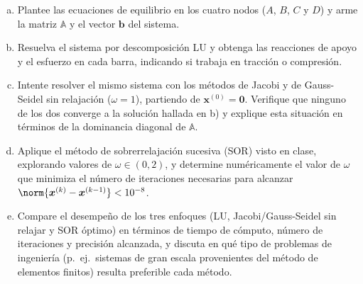 \documentclass[11pt]{article}
\begin{document}
\begin{question}
	\begin{enumerate}[a)]
		\item Plantee las ecuaciones de equilibrio en los cuatro nodos ($A$, $B$, $C$ y
		      $D$) y arme la matriz $\mathbb{A}$ y el vector $\bm{b}$ del sistema.
		\item Resuelva el sistema por descomposición LU y obtenga las reacciones de
		      apoyo y el esfuerzo en cada barra, indicando si trabaja en tracción o
		      compresión.
		\item Intente resolver el mismo sistema con los métodos de Jacobi y de
		      Gauss-Seidel sin relajación ($\omega = 1$), partiendo de $\bm{x}^{(0)} = \bm{0}$.
		      Verifique que ninguno de los dos converge a la solución hallada en b) y
		      explique esta situación en términos de la dominancia diagonal de
		      $\mathbb{A}$.
		\item Aplique el método de sobrerrelajación sucesiva (SOR) visto en clase,
		      explorando valores de $\omega \in (0,2)$, y determine numéricamente el valor
		      de $\omega$ que minimiza el número de iteraciones necesarias para alcanzar
		      $\norm{\bm{x}^{(k)} - \bm{x}^{(k-1)}} < 10^{-8}$.
		\item Compare el desempeño de los tres enfoques (LU, Jacobi/Gauss-Seidel sin
		      relajar y SOR óptimo) en términos de tiempo de cómputo, número de
		      iteraciones y precisión alcanzada, y discuta en qué tipo de problemas de
		      ingeniería (p.\ ej.\ sistemas de gran escala provenientes del método de
		      elementos finitos) resulta preferible cada método.
	\end{enumerate}
\end{question}
\end{document}
